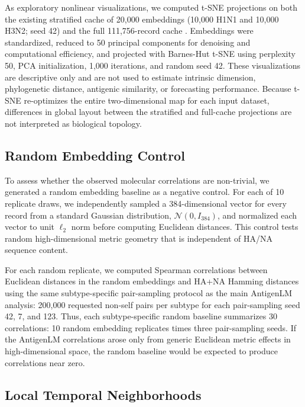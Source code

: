 \documentclass[11pt]{article}
\begin{document}
As exploratory nonlinear visualizations, we computed t-SNE projections on both the existing stratified cache of 20,000 embeddings (10,000 H1N1 and 10,000 H3N2; seed 42) and the full 111,756-record cache \cite{vandermaaten2008tsne,vandermaaten2014accelerating}. Embeddings were standardized, reduced to 50 principal components for denoising and computational efficiency, and projected with Barnes-Hut t-SNE using perplexity 50, PCA initialization, 1,000 iterations, and random seed 42. These visualizations are descriptive only and are not used to estimate intrinsic dimension, phylogenetic distance, antigenic similarity, or forecasting performance. Because t-SNE re-optimizes the entire two-dimensional map for each input dataset, differences in global layout between the stratified and full-cache projections are not interpreted as biological topology.

\subsection{Random Embedding Control}

To assess whether the observed molecular correlations are non-trivial, we generated a random embedding baseline as a negative control. For each of 10 replicate draws, we independently sampled a 384-dimensional vector for every record from a standard Gaussian distribution, $\mathcal{N}(0,I_{384})$, and normalized each vector to unit $\ell_2$ norm before computing Euclidean distances. This control tests random high-dimensional metric geometry that is independent of HA/NA sequence content.

For each random replicate, we computed Spearman correlations between Euclidean distances in the random embeddings and HA+NA Hamming distances using the same subtype-specific pair-sampling protocol as the main AntigenLM analysis: 200,000 requested non-self pairs per subtype for each pair-sampling seed 42, 7, and 123. Thus, each subtype-specific random baseline summarizes 30 correlations: 10 random embedding replicates times three pair-sampling seeds. If the AntigenLM correlations arose only from generic Euclidean metric effects in high-dimensional space, the random baseline would be expected to produce correlations near zero.

\subsection{Local Temporal Neighborhoods}
\end{document}
